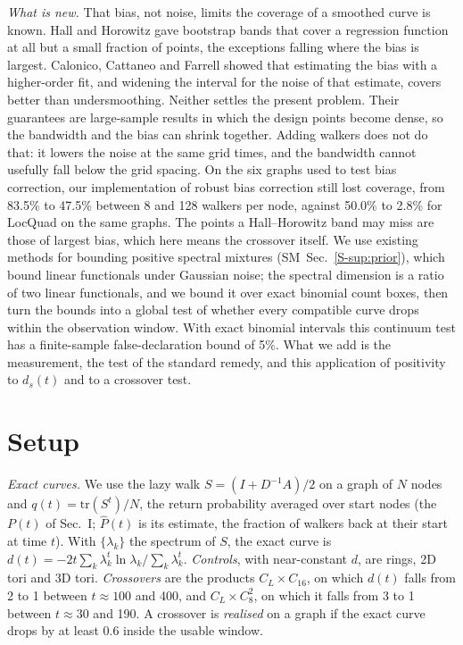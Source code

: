 \documentclass[aps,pre,twocolumn,superscriptaddress,nofootinbib,10pt]{revtex4-2}
\newcommand{\dt}{d_s(t)}
\newcommand{\SM}{SM}
\newcommand{\nm}[1]{\textsf{#1}}
\newcommand{\LQ}{\nm{LocQuad}}
\begin{document}
\emph{What is new.} That bias, not noise, limits the coverage of a smoothed curve is known. Hall and Horowitz \cite{hallhorowitz2013} gave bootstrap bands that cover a regression function at all but a small fraction of points, the exceptions falling where the bias is largest. Calonico, Cattaneo and Farrell \cite{ccf2018,ccf2022} showed that estimating the bias with a higher-order fit, and widening the interval for the noise of that estimate, covers better than undersmoothing. Neither settles the present problem. Their guarantees are large-sample results in which the design points become dense, so the bandwidth and the bias can shrink together. Adding walkers does not do that: it lowers the noise at the same grid times, and the bandwidth cannot usefully fall below the grid spacing. On the six graphs used to test bias correction, our implementation of robust bias correction still lost coverage, from 83.5\% to 47.5\% between 8 and 128 walkers per node, against 50.0\% to 2.8\% for \LQ{} on the same graphs. The points a Hall--Horowitz band may miss are those of largest bias, which here means the crossover itself. We use existing methods for bounding positive spectral mixtures \cite{stark1992,lawrence2024,mutzel2026,lehner2026} (\SM\ Sec.~\ref{S-sup:prior}), which bound linear functionals under Gaussian noise; the spectral dimension is a ratio of two linear functionals, and we bound it over exact binomial count boxes, then turn the bounds into a global test of whether every compatible curve drops within the observation window. With exact binomial intervals this continuum test has a finite-sample false-declaration bound of 5\%. What we add is the measurement, the test of the standard remedy, and this application of positivity to $\dt$ and to a crossover test.

\section{Setup}\label{sec:bench}
\emph{Exact curves.} We use the lazy walk $S=(I+D^{-1}A)/2$ on a graph of $N$ nodes and $q(t)=\mathrm{tr}(S^t)/N$, the return probability averaged over start nodes (the $P(t)$ of Sec.~I; $\hat P(t)$ is its estimate, the fraction of walkers back at their start at time $t$). With $\{\lambda_k\}$ the spectrum of $S$, the exact curve is $d(t)=-2t\sum_k\lambda_k^t\ln\lambda_k/\sum_k\lambda_k^t$. \emph{Controls}, with near-constant $d$, are rings, 2D tori and 3D tori. \emph{Crossovers} are the products $C_L\times C_{16}$, on which $d(t)$ falls from 2 to 1 between $t\approx100$ and 400, and $C_L\times C_8^2$, on which it falls from 3 to 1 between $t\approx30$ and 190. A crossover is \emph{realised} on a graph if the exact curve drops by at least 0.6 inside the usable window.
\end{document}
